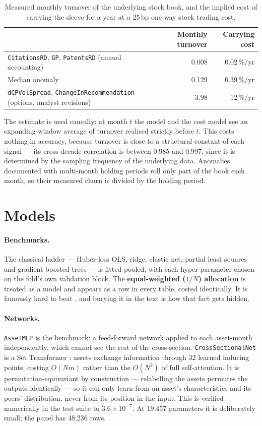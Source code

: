 \documentclass[11pt,a4paper]{article}
\begin{document}
\begin{table}[t]
\centering\small
\caption{Measured monthly turnover of the underlying stock book, and the implied
cost of carrying the sleeve for a year at a 25\,bp one-way stock trading cost.}
\label{tab:turnover}
\begin{tabular}{lrr}
\toprule
& Monthly turnover & Carrying cost \\
\midrule
\texttt{CitationsRD}, \texttt{GP}, \texttt{PatentsRD} (annual accounting) & 0.008 & 0.02\,\%/yr \\
Median anomaly & 0.129 & 0.39\,\%/yr \\
\texttt{dCPVolSpread}, \texttt{ChangeInRecommendation} (options, analyst revisions) & 3.98 & 12\,\%/yr \\
\bottomrule
\end{tabular}
\end{table}

The estimate is used causally: at month $t$ the model and the cost model see an
expanding-window average of turnover realised strictly before $t$. This costs
nothing in accuracy, because turnover is close to a structural constant of each
signal --- its cross-decade correlation is between 0.985 and 0.997, since it is
determined by the sampling frequency of the underlying data. Anomalies documented
with multi-month holding periods roll only part of the book each month, so their
measured churn is divided by the holding period.

\section{Models}\label{sec:models}

\paragraph{Benchmarks.} The classical ladder --- Huber-loss OLS, ridge, elastic
net, partial least squares and gradient-boosted trees --- is fitted pooled, with
each hyper-parameter chosen on the fold's own validation block. The
\textbf{equal-weighted ($1/N$) allocation} is treated as a model and appears as a
row in every table, costed identically. It is famously hard to beat
\citep{DeMiguel2009}, and burying it in the text is how that fact gets hidden.

\paragraph{Networks.} \texttt{AssetMLP} is the \citet{GuKellyXiu2020} benchmark: a
feed-forward network applied to each asset-month independently, which cannot see
the rest of the cross-section. \texttt{CrossSectionalNet} is a Set Transformer
\citep{Lee2019}: assets exchange information through 32 learned inducing points,
costing $O(Nm)$ rather than the $O(N^2)$ of full self-attention. It is
permutation-equivariant by construction --- relabelling the assets permutes the
outputs identically --- so it can only learn from an asset's characteristics and
its peers' distribution, never from its position in the input. This is verified
numerically in the test suite to $3.6\times10^{-7}$. At 19{,}457 parameters it is
deliberately small; the panel has 48{,}236 rows.
\end{document}
